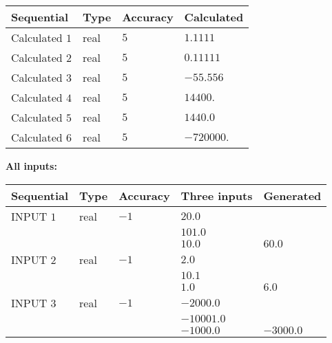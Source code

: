 \documentclass[12pt]{article}
\begin{document}
   
   
   
\noindent{}
   
   
  
  
\noindent\begin{tabular}{|l|l|l|l|}
\hline
 Sequential & Type & Accuracy & Calculated \\ 
\hline
 
 
  Calculated $            1 $ & real & $            5  $ & 
 $ 1.1111 $ 
 \\  \hline  
 
 
  Calculated $            2 $ & real & $            5  $ & 
 $ 0.11111 $ 
 \\  \hline  
 
 
  Calculated $            3 $ & real & $            5  $ & 
 $ -55.556 $ 
 \\  \hline  
 
 
  Calculated $            4 $ & real & $            5  $ & 
 $ 14400. $ 
 \\  \hline  
 
 
  Calculated $            5 $ & real & $            5  $ & 
 $ 1440.0 $ 
 \\  \hline  
 
 
  Calculated $            6 $ & real & $            5  $ & 
 $ -720000. $ 
 \\  \hline  
 \end{tabular}
   
   
   
   
\noindent\vspace{0.1in}\hspace{-0.08in} {\textbf{\Large{All inputs: }}}
   
   
  
  
\noindent\begin{tabular}{|l|l|l|l|l|}
\hline
 Sequential & Type & Accuracy & Three inputs & Generated \\ 
\hline
 
 
  INPUT $            1 $ & real & $           -1  $ & $
 20.0
  $ & \\
  & & &  $
 101.0
  $ & \\
  & & &  $
 10.0
 $ & $ 60.0 $ 
 \\  \hline  
 
 
  INPUT $            2 $ & real & $           -1  $ & $
 2.0
  $ & \\
  & & &  $
 10.1
  $ & \\
  & & &  $
 1.0
 $ & $ 6.0 $ 
 \\  \hline  
 
 
  INPUT $            3 $ & real & $           -1  $ & $
 -2000.0
  $ & \\
  & & &  $
 -10001.0
  $ & \\
  & & &  $
 -1000.0
 $ & $ -3000.0 $ 
 \\  \hline  
 \end{tabular}
   
\end{document}

